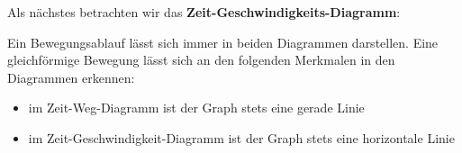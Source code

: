 
Als nächstes betrachten wir das \textbf{Zeit-Geschwindigkeits-Diagramm}:


Ein Bewegungsablauf lässt sich immer in beiden Diagrammen darstellen. Eine gleichförmige Bewegung lässt sich an den folgenden Merkmalen in den Diagrammen erkennen:
\begin{itemize}
\item im Zeit-Weg-Diagramm ist der Graph stets eine gerade Linie
\item im Zeit-Geschwindigkeit-Diagramm ist der Graph stets eine horizontale Linie
\end{itemize}
\newpage


